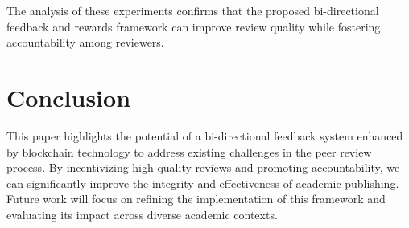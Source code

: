 \documentclass{article} %
\begin{document}
The analysis of these experiments confirms that the proposed bi-directional feedback and rewards framework can improve review quality while fostering accountability among reviewers. 

\section{Conclusion}
This paper highlights the potential of a bi-directional feedback system enhanced by blockchain technology to address existing challenges in the peer review process. By incentivizing high-quality reviews and promoting accountability, we can significantly improve the integrity and effectiveness of academic publishing. Future work will focus on refining the implementation of this framework and evaluating its impact across diverse academic contexts.



\end{document}
